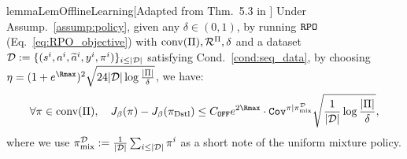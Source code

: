 %
\begin{restatable}{lemma}{LemOfflineLearning}\label{lem:offline_learning}[Adapted from Thm.~5.3 in \citep{liu2024provably}]
    Under Assump.~\ref{assump:policy}, given any $\delta \in (0,1)$, by running ${\texttt{RPO}}$ (Eq.~\eqref{eq:RPO_objective}) with $\text{conv}(\Pi), \mathcal{R}^{\Pi}, \delta$ and a dataset $\mathcal{D} := \{(s^i,a^i,\widetilde{a}^i,y^i,\pi^i)\}_{i\leq |\mathcal{D}|}$ satisfying Cond.~\ref{cond:seq_data}, by choosing $\eta = (1+e^{{\Rmax}})^2 \sqrt{24|\cD|\log\frac{|\Pi|}{\delta}}$, we have:
    \begin{align*}
        \forall \pi \in \conv(\Pi),\quad J_\beta(\pi) - J_\beta(\pi_\SELF) \leq C_\Offline e^{2{\Rmax}}\cdot \cov^{\pi|\pi_\mix^\cD}\sqrt{\frac{1}{|\cD|}\log\frac{|\Pi|}{\delta}},
    \end{align*}
    where we use $\pi_{\text{mix}}^{\mathcal{D}} := \frac{1}{|\mathcal{D}|}\sum_{i\leq |\mathcal{D}|} \pi^{i}$ as a short note of the uniform mixture policy.
\end{restatable}
